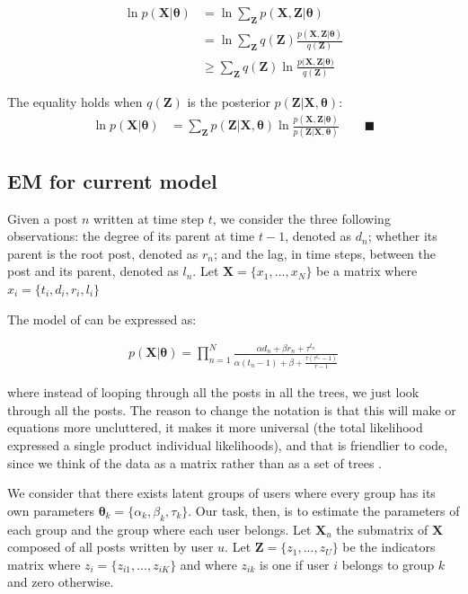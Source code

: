 \documentclass[smallextended]{svjour3}          %
\begin{document}
\begin{align}
\ln p(\mathbf{X} | \boldsymbol{\theta}) &=  \ln \sum_{\mathbf{Z}}  p(\mathbf{X}, \mathbf{Z}  | \boldsymbol{\theta}) \\
&=\ln \sum_{\mathbf{Z}} q(\mathbf{Z}) \frac{p(\mathbf{X}, \mathbf{Z}  | \boldsymbol{\theta})}{ q(\mathbf{Z})}\\
&\geq \sum_{\mathbf{Z}} q(\mathbf{Z}) \ln \frac{p(\mathbf{X}, \mathbf{Z} | \boldsymbol{\theta)}}{q(\mathbf{Z})}
\end{align}


The equality holds when $q(\mathbf{Z})$ is the posterior $p(\mathbf{Z} | \mathbf{X}, \boldsymbol{\theta})$:
\begin{align}
\ln p(\mathbf{X} | \boldsymbol{\theta}) &=  \sum_{\mathbf{Z}} p(\mathbf{Z} | \mathbf{X}, \boldsymbol{\theta}) \ln \frac{p(\mathbf{X, Z} | \boldsymbol{\theta})}{ p(\mathbf{Z} | \mathbf{X}, \boldsymbol{\theta})} \qquad \blacksquare
\label{eq:em_general}
\end{align}


\subsection{EM for current model} 

Given a post $n$ written at time step $t$, we consider the three following observations: the degree of its parent at time $t-1$, denoted as $d_n$; whether its parent is the root post, denoted as $r_n$; and the lag, in time steps, between the post and its parent, denoted as $l_n$. Let $\mathbf{X} = \{x_1,...,x_N\}$ be a matrix where $x_i = \{t_i, d_i, r_i, l_i\}$

The model of \cite{Gomez2012} can be expressed as:

\begin{align}
p(\mathbf{X} | \boldsymbol{\theta}) = \prod_{n=1}^N
\frac{\alpha d_n + \beta r_n + \tau^{l_n}}{\alpha(t_n-1)+\beta + \frac{\tau(\tau^{t_n}-1)}{\tau-1}}
\end{align} 

where instead of looping through all the posts in all the trees, we just look through all the posts. The reason to change the notation is that this will make or equations more uncluttered, it makes it more universal (the total likelihood expressed a single product individual likelihoods), and that is friendlier to code, since we think of the data as a matrix rather than as a set of trees .  

We consider that there exists latent groups of users where every group has its own parameters $\mathbf{\theta}_k = \{\alpha_k, \beta_k, \tau_k\}$. Our task, then, is to estimate the parameters of each group and the group where each user belongs. Let $\mathbf{X}_u$ the submatrix of $\mathbf{X}$ composed of all posts written by user $u$. Let $\mathbf{Z} = \{z_1,...,z_U\}$ be the indicators matrix where $z_i=\{z_{i1},...,z_{iK}\}$ and where $z_{ik}$ is one if user $i$ belongs to group $k$ and zero otherwise.    
\end{document}
